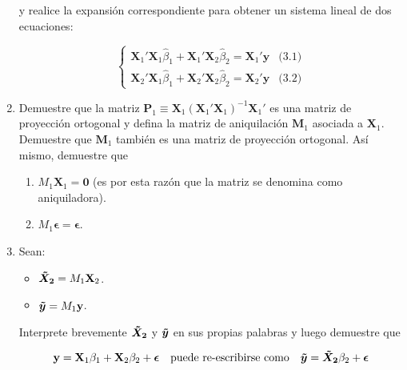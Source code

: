 \documentclass[a4paper, answers, addpoints, 11pt]{exam}
\begin{document}
\begin{enumerate}
     y realice la expansión correspondiente para obtener un sistema lineal de dos ecuaciones: 

    \begin{equation}
    \begin{cases}
    \textbf{X}_{1}'\textbf{X}_{1}\hat{\beta}_1 + \textbf{X}_{1}'\textbf{X}_{2}\hat{\beta}_2 = \textbf{X}_{1}'\textbf{y} & \text{(3.1)} \\
    \textbf{X}_{2}'\textbf{X}_{1}\hat{\beta}_1 + \textbf{X}_{2}'\textbf{X}_{2}\hat{\beta}_2 = \textbf{X}_{2}'\textbf{y} & \text{(3.2)}
    \end{cases}
    \end{equation}

    \bigskip

    \item Demuestre que la matriz $\textbf{P}_1 \equiv \textbf{X}_1(\textbf{X}_1'\textbf{X}_1)^{-1}\textbf{X}_1'$ es una matriz de proyección ortogonal y defina la matriz de aniquilación $\textbf{M}_1$ asociada a $\textbf{X}_1$. Demuestre que $\textbf{M}_1$ también es una matriz de proyección ortogonal. Así mismo, demuestre que 

    \begin{enumerate}\label{aniquiladoranotaciona}
        \item $M_1\textbf{X}_1 = \textbf{0}$ (es por esta razón que la matriz se denomina como aniquiladora).
        \item $M_1\boldsymbol\epsilon = \boldsymbol\epsilon$.
    \end{enumerate}


    \item Sean:
    
    \begin{itemize}\label{aniquiladoranotacion}
        \item $\boldsymbol{\Tilde{X}_2} =  M_1\textbf{X}_2$.
        \item $\boldsymbol{\Tilde{y}} =  M_1\textbf{y}$.
    \end{itemize}

    Interprete brevemente $\boldsymbol{\Tilde{X}_2}$ y $\boldsymbol{\Tilde{y}}$ en sus propias palabras y luego demuestre que

    \begin{equation}\label{eq:equiv}
        \textbf{y} = \textbf{X}_1\beta_1 + \textbf{X}_2\beta_2 + \boldsymbol\epsilon \quad \textrm{puede re-escribirse como} \quad \boldsymbol{\Tilde{y}} =\boldsymbol{\Tilde{X}_2}\beta_2 + \boldsymbol\epsilon
    \end{equation}


\end{enumerate}
\end{document}
